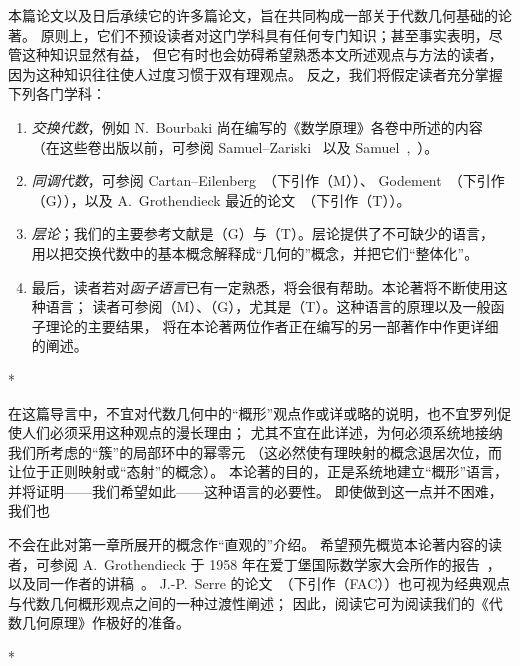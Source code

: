 \documentclass[UTF8,fontset=none,11pt,oneside,openany]{ctexbook}
\newcommand{\oldpage}[2][]{%
  \hypertarget{ega-source-page-#1-#2}{}%
  \marginnote{\scriptsize\textbf{#1}~|~#2}\ignorespaces}
\begin{document}
\oldpage[I]{5}

本篇论文以及日后承续它的许多篇论文，旨在共同构成一部关于代数几何基础的论著。
原则上，它们不预设读者对这门学科具有任何专门知识；甚至事实表明，尽管这种知识显然有益，
但它有时也会妨碍希望熟悉本文所述观点与方法的读者，因为这种知识往往使人过度习惯于双有理观点。
反之，我们将假定读者充分掌握下列各门学科：

\begin{enumerate}
  \item[a)] \emph{交换代数}，例如 N.~Bourbaki 尚在编写的《数学原理》各卷中所述的内容
  （在这些卷出版以前，可参阅 Samuel--Zariski~\cite{I-13} 以及 Samuel~\cite{I-11},~\cite{I-12}）。
  \item[b)] \emph{同调代数}，可参阅 Cartan--Eilenberg~\cite{I-2}（下引作（M））、
  Godement~\cite{I-4}（下引作（G）），以及 A.~Grothendieck 最近的论文~\cite{I-6}（下引作（T））。
  \item[c)] \emph{层论}；我们的主要参考文献是（G）与（T）。层论提供了不可缺少的语言，
  用以把交换代数中的基本概念解释成“几何的”概念，并把它们“整体化”。
  \item[d)] 最后，读者若对\emph{函子语言}已有一定熟悉，将会很有帮助。本论著将不断使用这种语言；
  读者可参阅（M）、（G），尤其是（T）。这种语言的原理以及一般函子理论的主要结果，
  将在本论著两位作者正在编写的另一部著作中作更详细的阐述。
\end{enumerate}

\bigskip
\begin{center}*\quad*\quad*\end{center}
\bigskip

在这篇导言中，不宜对代数几何中的“概形”观点作或详或略的说明，也不宜罗列促使人们必须采用这种观点的漫长理由；
尤其不宜在此详述，为何必须系统地接纳我们所考虑的“簇”的局部环中的幂零元
（这必然使有理映射的概念退居次位，而让位于正则映射或“态射”的概念）。
本论著的目的，正是系统地建立“概形”语言，并将证明——我们希望如此——这种语言的必要性。
即使做到这一点并不困难，我们也

\oldpage[I]{6}
不会在此对第一章所展开的概念作“直观的”介绍。
希望预先概览本论著内容的读者，可参阅 A.~Grothendieck 于 1958 年在爱丁堡国际数学家大会所作的报告~\cite{I-7}，
以及同一作者的讲稿~\cite{I-8}。
J.-P.~Serre 的论文~\cite{I-14}（下引作（FAC））也可视为经典观点与代数几何概形观点之间的一种过渡性阐述；
因此，阅读它可为阅读我们的《代数几何原理》作极好的准备。

\bigskip
\begin{center}*\quad*\quad*\end{center}
\bigskip
\end{document}
